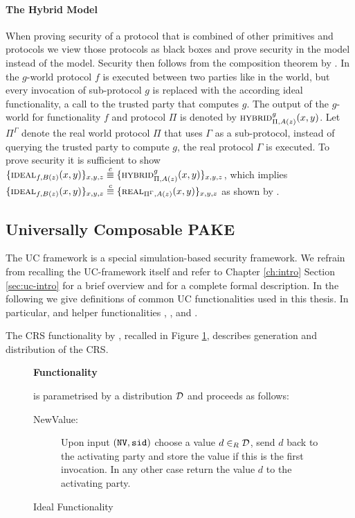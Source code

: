 \paragraph{The Hybrid Model}
When proving security of a protocol that is combined of other primitives and protocols we view those protocols as black boxes and prove security in the \HYBRID model instead of the \REAL model.
Security then follows from the composition theorem by \citet{Canetti00}.
In the $g$-\HYBRID world protocol $f$ is executed between two parties like in the \REAL world, but every invocation of sub-protocol $g$ is replaced with the according ideal functionality, \ie a call to the trusted party that computes $g$.
The output of the $g$-\HYBRID world for functionality $f$ and protocol $\Pi$ is denoted by $\HYBRID_{\Pi, A(z)}^{g} (x, y)$.
Let $\Pi^\Gamma$ denote the real world protocol $\Pi$ that uses $\Gamma$ as a sub-protocol, \ie instead of querying the trusted party to compute $g$, the real protocol $\Gamma$ is executed.
To prove security it is sufficient to show 
$\{\IDEAL_{f, B(z)}(x, y)\}_{x, y, z} \stackrel{c}{\equiv} \{\HYBRID_{\Pi, A(z)}^{g} (x, y)\}_{x, y, z}$,
which implies
$\{\IDEAL_{f, B(z)}(x, y)\}_{x, y, z} \stackrel{c}{\equiv} \{\REAL_{\Pi^{\Gamma}, A(z)} (x, y)\}_{x, y, z}$
as shown by \citet{Canetti00}.

\subsection{Universally Composable PAKE} \label{sec:uc-prelims}
The \ac{UC} framework is a special simulation-based security framework.
We refrain from recalling the \ac{UC}-framework itself and refer to Chapter \ref{ch:intro} Section \ref{sec:uc-intro} for a brief overview and \citet{Canetti2001a} for a complete formal description.
In the following we give definitions of common \ac{UC} functionalities used in this thesis.
In particular, \FPAKE and helper functionalities \Fcrs, \Fca, and \Finit.

The \ac{CRS} functionality by \citet{CanettiF01}, recalled in Figure \ref{fig:crsfunctionality}, describes generation and distribution of the \ac{CRS}.

\begin{figure}[h!]
\begin{mdframed}[innertopmargin=10pt]
\begin{center}
{\bf Functionality \Fcrs}
\end{center}
\Fcrs is parametrised by a distribution $\mathcal{D}$ and proceeds as follows:

\begin{description}
	
	\item[NewValue:] Upon input $(\mathtt{NV}, \mathtt{sid})$ choose a value $d\in_R\mathcal{D}$, send $d$ back to the activating party and store the value if this is the first invocation.
	  In any other case return the value $d$ to the activating party.
	
\end{description}
\end{mdframed}
\caption{Ideal Functionality \Fcrs}
\label{fig:crsfunctionality}
\end{figure}

